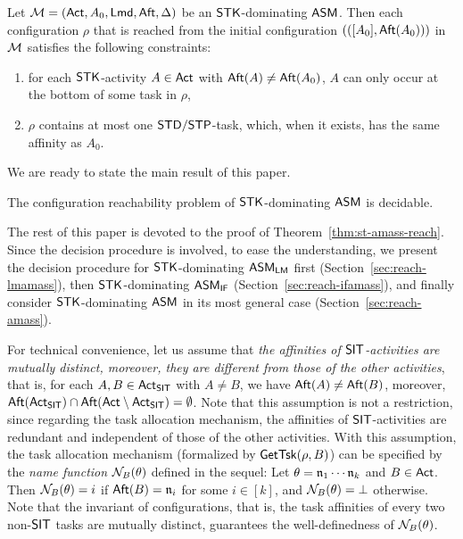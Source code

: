 \begin{example}
\end{example}


\begin{proposition}\label{prop-stk}
    Let ${\mathcal{M} }=({\sf Act},A_0,{\sf Lmd},{\sf Aft},\Delta)$ be an $\mathsf{STK}$-dominating $\textsf{ASM}$. Then each configuration $\rho$ that is reached from the initial configuration $(([A_0],{\sf Aft}(A_0)))$ in ${\mathcal{M} }$ satisfies the following constraints:
    \begin{enumerate}
        \item for each $\mathsf{STK}$-activity $A\in{\sf Act}$ with ${\sf Aft}(A)\neq{\sf Aft}(A_0)$, $A$ can only occur at the bottom of some task in $\rho$, 
        \item $\rho$ contains at most one ${\sf STD}/{\sf STP}$-task, which, when it exists, has the same affinity as $A_0$.
    \end{enumerate}
\end{proposition}

We are ready to state the main result of this paper. 

\begin{theorem}\label{thm:st-amass-reach}
The configuration reachability problem of $\mathsf{STK}$-dominating $\textsf{ASM}$ is decidable.
\end{theorem}

The rest of this paper is devoted to the proof of Theorem~\ref{thm:st-amass-reach}. Since the decision procedure is involved, to ease the understanding, we present the decision procedure for ${\sf STK}$-dominating $\textsf{ASM}_\textsf{LM}$ first (Section~\ref{sec:reach-lmamass}), then ${\sf STK}$-dominating $\textsf{ASM}_\textsf{IF}$ (Section~\ref{sec:reach-ifamass}), and finally consider ${\sf STK}$-dominating $\textsf{ASM}$ in its most general case (Section~\ref{sec:reach-amass}). 

For technical convenience, let us assume that \emph{the affinities of ${\sf SIT}$-activities are mutually distinct, moreover, they are different from those of the other activities}, that is, for each $A, B \in {\sf Act}_{\sf SIT}$ with $A \neq B$, we have ${\sf Aft}(A) \neq {\sf Aft}(B)$, moreover, ${\sf Aft}({\sf Act}_{\sf SIT}) \cap {\sf Aft}({\sf Act} \setminus {\sf Act}_{\sf SIT}) = \emptyset$. Note that this assumption is not a restriction, since regarding the task allocation mechanism, the affinities of ${\sf SIT}$-activities are redundant and independent of those of the other activities. With this assumption, the task allocation mechanism (formalized by $\mathsf{GetTsk}(\rho, B)$) can be specified by the \emph{name function} $\mathcal{N}_B(\theta)$ defined in the sequel:  Let $\theta = \mathfrak{n}_1 \cdots \mathfrak{n}_k$ and $B \in {\sf Act}$. Then $\mathcal{N}_B(\theta) = i$ if ${\sf Aft}(B) = \mathfrak{n}_i$ for some $i \in [k]$, and $\mathcal{N}_B(\theta) = \bot$ otherwise. Note that the invariant of configurations, that is, the task affinities of every two non-${\sf SIT}$ tasks are mutually distinct, guarantees the well-definedness of $\mathcal{N}_B(\theta)$.

